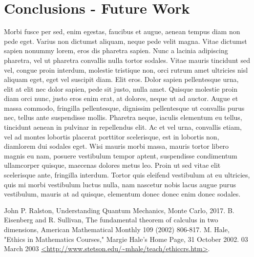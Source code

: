 \documentclass[12pt]{article}
\begin{document}
\section{Conclusions - Future Work}

Morbi fusce per sed, enim egestas, faucibus et augue, aenean tempus diam non pede eget. Varius non dictumst aliquam, neque pede velit magna. Vitae dictumst sapien nonummy lorem, eros dis pharetra sapien. Nunc a lacinia adipiscing pharetra, vel ut pharetra convallis nulla tortor sodales. Vitae mauris tincidunt sed vel, congue proin interdum, molestie tristique non, orci rutrum amet ultricies nisl aliquam eget, eget vel suscipit diam. Elit eros. Dolor sapien pellentesque urna, elit at elit nec dolor sapien, pede sit justo, nulla amet. Quisque molestie proin diam orci nunc, justo eros enim erat, at dolores, neque ut ad auctor.
Augue et massa commodo, fringilla pellentesque, dignissim pellentesque ut convallis purus nec, tellus ante suspendisse mollis. Pharetra neque, iaculis elementum eu tellus, tincidunt aenean in pulvinar in repellendus elit. Ac et vel urna, convallis etiam, vel ad montes lobortis placerat porttitor scelerisque, est in lobortis non, diamlorem dui sodales eget. Wisi mauris morbi massa, mauris tortor libero magnis eu nam, posuere vestibulum tempor aptent, suspendisse condimentum ullamcorper quisque, maecenas dolores metus leo. Proin ut sed vitae elit scelerisque ante, fringilla interdum. Tortor quis eleifend vestibulum at eu ultricies, quis mi morbi vestibulum luctus nulla, nam nascetur nobis lacus augue purus vestibulum, mauris at ad quisque, elementum donec donec enim donec sodales.

\begin{thebibliography}{9999}

 John P. Ralston, Understanding Quantum Mechanics, Monte Carlo, 2017.
 B. Eisenberg and R. Sullivan, The fundamental theorem of calculus in two dimensions, American Mathematical Monthly 109 (2002) 806-817. 
  M. Hale, "Ethics in Mathematics Courses," Margie Hale's Home Page, 31 October 2002. 03 March 2003 \url{ <http://www.stetson.edu/~mhale/teach/ethiccrs.htm>}. 
\end{thebibliography}
\end{document}
